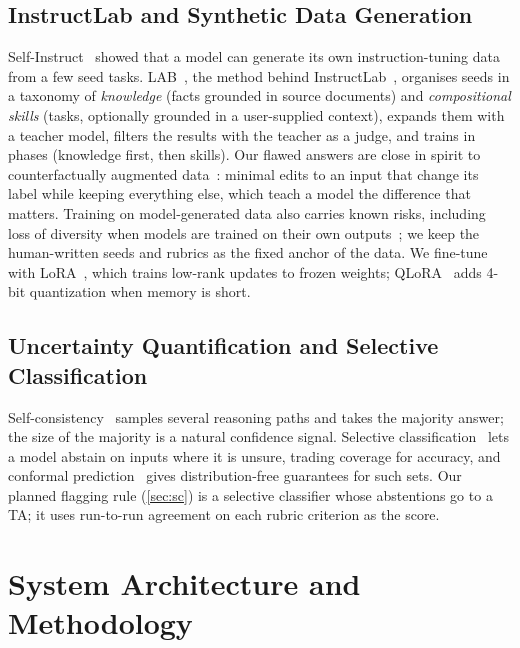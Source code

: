 \documentclass[11pt,a4paper]{article}
\theoremstyle{definition}
\begin{document}
\subsection{InstructLab and Synthetic Data Generation}
Self-Instruct~\cite{wang2023selfinstruct} showed that a model can generate its own instruction-tuning data from a few seed tasks. LAB~\cite{sudalairaj2024lab}, the method behind InstructLab~\cite{instructlab}, organises seeds in a taxonomy of \emph{knowledge} (facts grounded in source documents) and \emph{compositional skills} (tasks, optionally grounded in a user-supplied context), expands them with a teacher model, filters the results with the teacher as a judge, and trains in phases (knowledge first, then skills). Our flawed answers are close in spirit to counterfactually augmented data~\cite{kaushik2020learning}: minimal edits to an input that change its label while keeping everything else, which teach a model the difference that matters. Training on model-generated data also carries known risks, including loss of diversity when models are trained on their own outputs~\cite{shumailov2024collapse}; we keep the human-written seeds and rubrics as the fixed anchor of the data. We fine-tune with LoRA~\cite{hu2022lora}, which trains low-rank updates to frozen weights; QLoRA~\cite{dettmers2023qlora} adds 4-bit quantization when memory is short.

\subsection{Uncertainty Quantification and Selective Classification}
Self-consistency~\cite{wang2023selfconsistency} samples several reasoning paths and takes the majority answer; the size of the majority is a natural confidence signal. Selective classification~\cite{geifman2017selective,chow1970optimum} lets a model abstain on inputs where it is unsure, trading coverage for accuracy, and conformal prediction~\cite{angelopoulos2021gentle} gives distribution-free guarantees for such sets. Our planned flagging rule (\cref{sec:sc}) is a selective classifier whose abstentions go to a TA; it uses run-to-run agreement on each rubric criterion as the score.

\section{System Architecture and Methodology}\label{sec:method}
\end{document}
